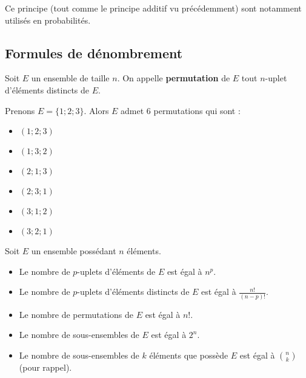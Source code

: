 	Ce principe (tout comme le principe additif vu précédemment) sont notamment utilisés en probabilités.

	\subsection{Formules de dénombrement}

	\begin{formula}[Permutations]
		Soit $E$ un ensemble de taille $n$. On appelle \textbf{permutation} de $E$ tout $n$-uplet d'éléments distincts de $E$.
	\end{formula}

	\begin{tip}[Exemple]
		Prenons $E = \{1; 2; 3\}$. Alors $E$ admet $6$ permutations qui sont :
		\begin{itemize}
			\item $(1; 2; 3)$
			\item $(1; 3; 2)$
			\item $(2; 1; 3)$
			\item $(2; 3; 1)$
			\item $(3; 1; 2)$
			\item $(3; 2; 1)$
		\end{itemize}
	\end{tip}

	\begin{formula}[Formules]
		Soit $E$ un ensemble possédant $n$ éléments.
		\begin{itemize}
			\item Le nombre de $p$-uplets d'éléments de $E$ est égal à $n^p$.
			\item Le nombre de $p$-uplets d'éléments distincts de $E$ est égal à $\frac{n!}{(n-p)!}$.
			\item Le nombre de permutations de $E$ est égal à $n!$.
			\item Le nombre de sous-ensembles de $E$ est égal à $2^n$.
			\item Le nombre de sous-ensembles de $k$ éléments que possède $E$ est égal à $\binom{n}{k}$ (pour rappel).
		\end{itemize}
	\end{formula}

